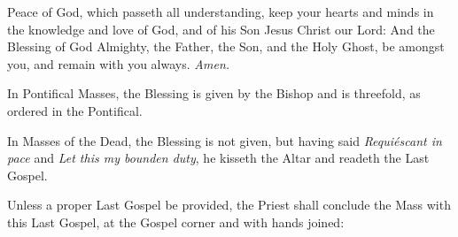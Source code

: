  Peace of God, which passeth all understanding, keep your hearts and minds in the knowledge and love of God, and of his Son Jesus Christ our Lord: And the Blessing of God Almighty, the Father, {} the Son, and the Holy Ghost, be amongst you, and remain with you always. \textit{Amen.}
\begin{rubric}
    In Pontifical Masses, the Blessing is given by the Bishop and is threefold, as ordered in the Pontifical.
\end{rubric}
\begin{rubric}
    In Masses of the Dead, the Blessing is not given, but having said \emph{Requiéscant in pace} and \emph{Let this my bounden duty}, he kisseth the Altar and readeth the Last Gospel.
\end{rubric}
\begin{rubric}
    Unless a proper Last Gospel be provided, the Priest shall conclude the Mass with this Last Gospel, at the Gospel corner and with hands joined:
\end{rubric}
